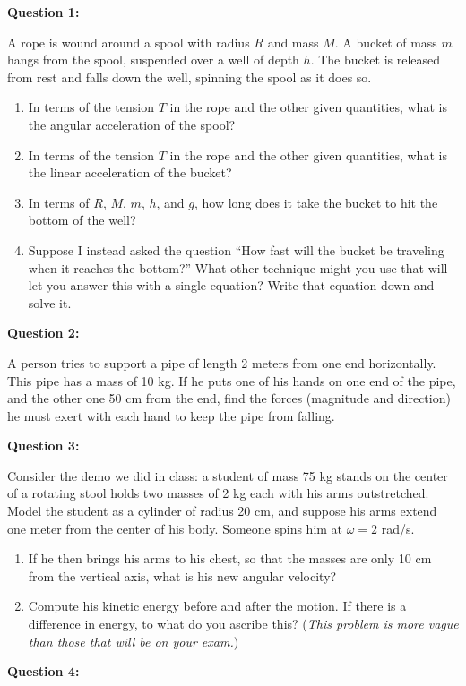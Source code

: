 \documentclass[12pt]{article}
\begin{document}
\bigskip
\bigskip
\bigskip
\bigskip

\Large \centerline{}
\normalsize

{\bf Question 1:}

A rope is wound around a spool with radius $R$ and mass $M$. A bucket of mass $m$ hangs from the spool, suspended over a well of depth $h$. The bucket is released from rest and falls down the well, spinning the spool as it does so.

\begin{enumerate}
  \item{In terms of the tension $T$ in the rope and the other given quantities, what is the angular acceleration of the spool?}
  \item{In terms of the tension $T$ in the rope and the other given quantities, what is the linear acceleration of the bucket?}
  \item{In terms of $R$, $M$, $m$, $h$, and $g$, how long does it take the bucket to hit the bottom of the well?}
  \item{Suppose I instead asked the question ``How fast will the bucket be traveling when it reaches the bottom?'' What other technique might you use that will let you answer this with a single equation? Write that equation down and solve it.}
\end{enumerate}

{\bf Question 2:}

A person tries to support a pipe of length 2 meters from one end horizontally. This pipe has a mass of 10 kg. If he puts one of his hands on one end of the pipe, and the other one 50 cm from the end, 
find the forces (magnitude and direction) he must exert with each hand to keep the pipe from falling.

{\bf Question 3:}

Consider the demo we did in class: a student of mass 75 kg stands on the center of a rotating stool holds two masses of 2 kg each with his arms outstretched. Model the student as a cylinder of radius 20 cm, and suppose his arms extend one meter from the center of 
his body. Someone spins him at $\omega=2$ rad/s. 

\begin{enumerate}
  \item{If he then brings his arms to his chest, so that the masses are only 10 cm from the vertical axis, what is his new angular velocity?}
  \item{Compute his kinetic energy before and after the motion. If there is a difference in energy, to what do you ascribe this? ({\it This problem is more vague than those that will be on your exam.})}
\end{enumerate}
\newpage
{\bf Question 4:}
\end{document}
